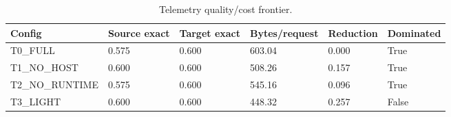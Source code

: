 \begin{table}[t]
\centering
\small
\caption{Telemetry quality/cost frontier.}
\begin{tabular}{llllll}
\hline
Config & Source exact & Target exact & Bytes/request & Reduction & Dominated \\
\hline
T0\_FULL & 0.575 & 0.600 & 603.04 & 0.000 & True \\
T1\_NO\_HOST & 0.600 & 0.600 & 508.26 & 0.157 & True \\
T2\_NO\_RUNTIME & 0.575 & 0.600 & 545.16 & 0.096 & True \\
T3\_LIGHT & 0.600 & 0.600 & 448.32 & 0.257 & False \\
\hline
\end{tabular}
\end{table}
